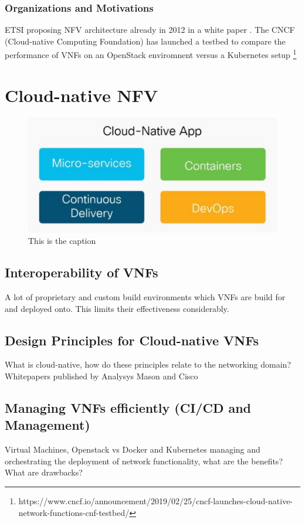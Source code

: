\subsubsection{Organizations and Motivations}
ETSI proposing NFV architecture already in 2012 in a white paper  \cite{nfv_wp}. The CNCF (Cloud-native Computing Foundation) has launched a testbed to compare the performance of VNFs on an OpenStack enviromnent versus a Kubernetes setup \footnote{https://www.cncf.io/announcement/2019/02/25/cncf-launches-cloud-native-network-functions-cnf-testbed/}	

\section{Cloud-native NFV}

\begin{figure}
	\centering
	\includegraphics[width=0.75\linewidth]{images/cloudNativeApp.png}
	\caption{This is the caption \cite{CNF}}
	\label{img:cloudNativeApp}
\end{figure}

\subsection{Interoperability of VNFs}
A lot of proprietary and custom build environments which VNFs are build for and deployed onto. This limits their effectiveness considerably.
\subsection{Design Principles for Cloud-native VNFs }
What is cloud-native, how do these principles relate to  the networking domain? Whitepapers published by Analysys Mason \cite{evolutionnfv} and Cisco \cite{CNF}
\subsection{Managing VNFs efficiently (CI/CD and Management)}
Virtual Machines, Openstack vs Docker and Kubernetes managing and orchestrating the deployment of network functionality, what are the benefits? What are drawbacks?
